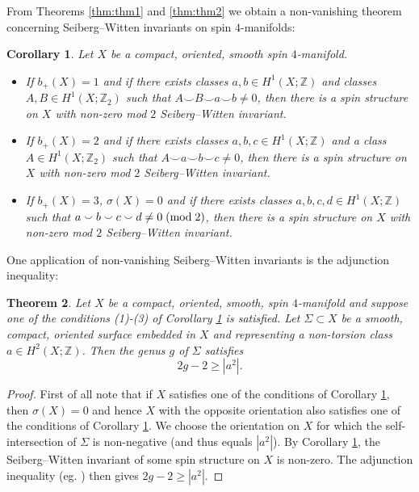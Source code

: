 \documentclass{amsart}
\newtheorem{theorem}{Theorem}[section]
\newtheorem{corollary}[theorem]{Corollary}
\theoremstyle{definition}
\theoremstyle{remark}
\numberwithin{equation}{section}
\begin{document}
From Theorems \ref{thm:thm1} and \ref{thm:thm2} we obtain a non-vanishing theorem concerning Seiberg--Witten invariants on spin $4$-manifolds:

\begin{corollary}\label{cor:nonzero}
Let $X$ be a compact, oriented, smooth spin $4$-manifold.
\begin{itemize}
\item[(1)]{If $b_+(X) = 1$ and if there exists classes $a,b \in H^1(X ; \mathbb{Z})$ and classes $A,B \in H^1(X ; \mathbb{Z}_2)$ such that $A \smallsmile B \smallsmile a \smallsmile b \neq 0$, then there is a spin structure on $X$ with non-zero mod $2$ Seiberg--Witten invariant.}
\item[(2)]{If $b_+(X) = 2$ and if there exists classes $a,b,c \in H^1(X ; \mathbb{Z})$ and a class $A \in H^1(X ; \mathbb{Z}_2)$ such that $A \smallsmile a \smallsmile b \smallsmile c \neq 0$, then there is a spin structure on $X$ with non-zero mod $2$ Seiberg--Witten invariant.}
\item[(3)]{If $b_+(X) = 3$, $\sigma(X)=0$ and if there exists classes $a,b,c,d \in H^1(X ; \mathbb{Z})$ such that $a \smallsmile b \smallsmile c \smallsmile d \neq 0 \; ({\rm mod} \; 2)$, then there is a spin structure on $X$ with non-zero mod $2$ Seiberg--Witten invariant.}
\end{itemize}

\end{corollary}

One application of non-vanishing Seiberg--Witten invariants is the adjunction inequality:

\begin{theorem}
Let $X$ be a compact, oriented, smooth, spin $4$-manifold and suppose one of the conditions (1)-(3) of Corollary \ref{cor:nonzero} is satisfied. Let $\Sigma \subset X$ be a smooth, compact, oriented surface embedded in $X$ and representing a non-torsion class $a \in H^2(X ; \mathbb{Z})$. Then the genus $g$ of $\Sigma$ satisfies
\[
2g-2  \ge | a^2 |.
\]
\end{theorem}
\begin{proof}
First of all note that if $X$ satisfies one of the conditions of Corollary \ref{cor:nonzero}, then $\sigma(X) = 0$ and hence $X$ with the opposite orientation also satisfies one of the conditions of Corollary \ref{cor:nonzero}. We choose the orientation on $X$ for which the self-intersection of $\Sigma$ is non-negative (and thus equals $|a^2|$). By Corollary \ref{cor:nonzero}, the Seiberg--Witten invariant of some spin structure on $X$ is non-zero. The adjunction inequality (eg. \cite[Theorem 11]{law}) then gives $2g-2 \ge |a^2|$.
\end{proof}
\end{document}
